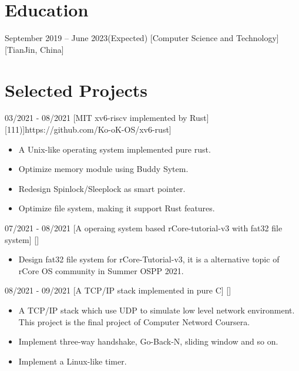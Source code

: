 \documentclass{chicv}
\begin{document}
\begin{basicinfo}
\end{basicinfo}

\section{Education}
  {September 2019 -- June 2023(Expected)}
  [Computer Science and Technology]
  [TianJin, China]



\section{Selected Projects}

  {03/2021 - 08/2021}
  [MIT xv6-riscv implemented by Rust]
  [\iconlink[\faGithub][Ko-oK/xv6-rust(\faIcon[regular]{star}111)]{https://github.com/Ko-oK-OS/xv6-rust}]
  \begin{itemize}
    \item A Unix-like operating system implemented pure rust. 
    \item Optimize memory module using Buddy Sytem.
    \item Redesign Spinlock/Sleeplock as smart pointer.
    \item Optimize file system, making it support Rust features.
  \end{itemize}

  {07/2021 - 08/2021}
  [A operaing system based rCore-tutorial-v3 with fat32 file system]
  []
  \begin{itemize}
    \item Design fat32 file system for rCore-Tutorial-v3, it is a alternative topic of rCore OS community in Summer OSPP 2021.
  \end{itemize}

  {08/2021 - 09/2021}
  [A TCP/IP stack implemented in pure C]
  []
  \begin{itemize}
    \item A TCP/IP stack which use UDP to simulate low level network environment. This project is the final project of Computer Netword Coursera.
    \item Implement three-way handshake, Go-Back-N, sliding window and so on.
    \item Implement a Linux-like timer.
  \end{itemize}
\end{document}
